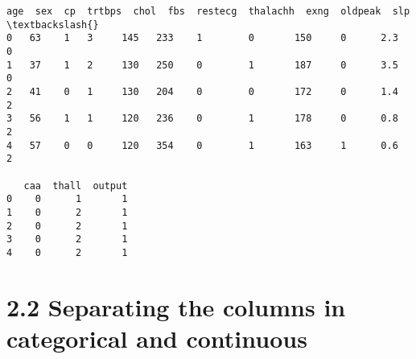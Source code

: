 \documentclass[11pt]{article}
\makeatletter
\newcommand{\boxspacing}{\kern\kvtcb@left@rule\kern\kvtcb@boxsep}
\newcommand{\prompt}[4]{
        {\ttfamily\llap{{\color{#2}[#3]:\hspace{3pt}#4}}\vspace{-\baselineskip}}
    }
\makeatother
\begin{document}
            \begin{tcolorbox}[breakable, size=fbox, boxrule=.5pt, pad at break*=1mm, opacityfill=0]
\prompt{Out}{outcolor}{4}{\boxspacing}
\begin{Verbatim}[commandchars=\\\{\}]
   age  sex  cp  trtbps  chol  fbs  restecg  thalachh  exng  oldpeak  slp  \textbackslash{}
0   63    1   3     145   233    1        0       150     0      2.3    0
1   37    1   2     130   250    0        1       187     0      3.5    0
2   41    0   1     130   204    0        0       172     0      1.4    2
3   56    1   1     120   236    0        1       178     0      0.8    2
4   57    0   0     120   354    0        1       163     1      0.6    2

   caa  thall  output
0    0      1       1
1    0      2       1
2    0      2       1
3    0      2       1
4    0      2       1
\end{Verbatim}
\end{tcolorbox}
        
    \hypertarget{separating-the-columns-in-categorical-and-continuous}{%
\section{2.2 Separating the columns in categorical and
continuous}\label{separating-the-columns-in-categorical-and-continuous}}
\end{document}
